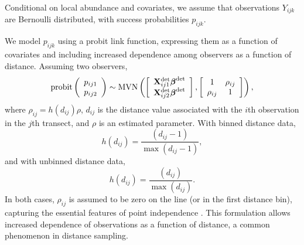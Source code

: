 \documentclass[10pt]{article}
\begin{document}
Conditional on local abundance and covariates, we assume that observations $Y_{ijk}$ are Bernoulli distributed, with success probabilities $p_{ijk}$.

We model $p_{ijk}$ using a probit link function, expressing them as a function of covariates and including increased dependence among observers as a function of distance.  Assuming two observers,
$$
{\rm probit} \left(\begin{array}{c}
				p_{ij1} \\
				p_{ij2}
		\end{array}\right) \sim {\rm MVN}
\left( \left[ \begin{array}{c}
				{\bf X}_{ij1}^{\rm det} \boldsymbol{\beta}^{\rm det}\\
				{\bf X}_{ij2}^{\rm det} \boldsymbol{\beta}^{\rm det}
		\end{array}\right],
        \left[ \begin{array}{cc}
            1 & \rho_{ij} \\
            \rho_{ij} & 1
        \end{array} \right]
\right),
$$
where $\rho_{ij} = h(d_{ij}) \rho$, $d_{ij}$ is the distance value associated with the $i$th observation in the $j$th transect, and $\rho$ is an estimated parameter.  With binned distance data,
$$
h(d_{ij})=\frac{(d_{ij}-1)}{\max(d_{ij}-1)},
$$
and with unbinned distance data,
$$
h(d_{ij})=\frac{(d_{ij})}{\max(d_{ij})}.
$$
In both cases, $\rho_{ij}$ is assumed to be zero on the line (or in the first distance bin), capturing the essential features of point independence \cite{BorchersEtAl2006,BucklandEtAl2010}.  This formulation allows increased dependence of observations as a function of distance, a common phenomenon in distance sampling.
\end{document}
